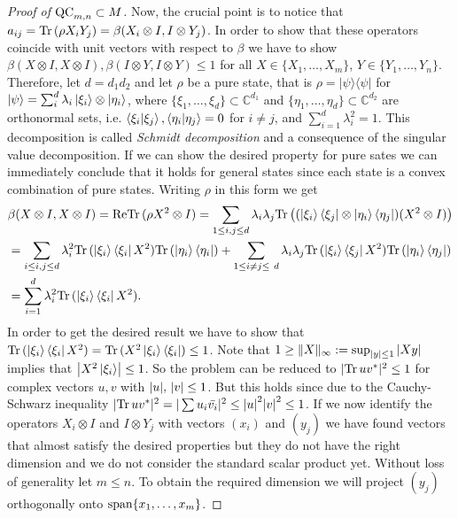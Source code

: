 \begin{proof}[Proof of $ \textup{QC}_{m,n} \subset M $]
	\noindent Now, the crucial point is to notice that $ a_{ij} =\textup{Tr} \, {(\rho X_i Y_j)} =  \beta(X_i \otimes I,I \otimes Y_j) $. In order to show that these operators coincide with unit vectors with respect to $  \beta  $ we have to show
	$ \beta(X \otimes I, X \otimes I), \beta(I \otimes Y, I \otimes Y) \le 1$ for all $ X \in \{X_1,\hdots,X_m \} $, $ Y \in \{Y_1,\hdots,Y_n \} $. 
	Therefore, let $ d = d_1d_2 $ and let $ \rho $ be a pure state, that is $ \rho = \vert \psi \rangle \langle \psi \vert $ for $ \vert \psi \rangle = \sum_{i}^{d}\lambda_i \ket{\xi_i} \otimes \ket{\eta_i} $, where $ \{ \xi_1,\hdots,\xi_d \} \subset \mathbb{C}^{d_1}$ and $ \{  \eta_1,\hdots,\eta_d\} \subset \mathbb{C}^{d_2}$ are orthonormal sets, i.e. $ \braket{\xi_i \vert \xi_j}, \braket{\eta_i \vert \eta_j} = 0 $ for $ i \neq j $, and $ \sum_{i=1}^d \lambda_i^2 = 1 $. This decomposition is called {\itshape Schmidt decomposition} and a consequence of the singular value decomposition. If we can show the desired property for pure sates we can immediately conclude that it holds for general states since each state is a convex combination of pure states. 
	Writing $ \rho $ in this form we get 
	\begin{align*}
	&\beta(X \otimes I, X \otimes I) = \textup{Re} \textup{Tr} \, {(\rho X^2 \otimes I)} =  \sum_{1 \le i,j \le d} \lambda_i\lambda_j \textup{Tr} \, {\big ((\ket{\xi_i} \bra{\xi_j} \otimes \ket{\eta_i}\bra{\eta_j})(X^2 \otimes I)\big ) }  \\
	&= \sum_{i\le i,j \le d}\lambda_i^2 \textup{Tr} \, {(\ket{\xi_i} \bra{\xi_i}X^2)} \textup{Tr} \, {(\ket{\eta_i}\bra{\eta_i})}   +  \sum_{1 \le i \neq j \le \ d}\lambda_i\lambda_j \textup{Tr} \, {(\ket{\xi_i}\bra{\xi_j}X^2)} \textup{Tr} \, {(\ket{\eta_i}\bra{\eta_j})}    \\
	&=  \sum_{i=1}^{d}\lambda_i^2 \textup{Tr} \, {(\ket{\xi_i} \bra{\xi_i}X^2)} .
	\end{align*}
	In order to get the desired result we have to show that $ \textup{Tr} \, {(\ket{\xi_i} \bra{\xi_i}X^2)}  = \textup{Tr} \, {(X^2\ket{\xi_i} \bra{\xi_i})}  \le 1 $. 
	Note that $1 \ge  \Vert {X} \Vert_{\infty} := \sup_{{\left|{y}\right|}\le 1} {\left|{Xy}\right|} $ implies that $ {\left|{X^2\ket{\xi_i}}\right|} \le 1 $. So the problem can be reduced to $ \vert \textup{Tr} \, {uv^*} \vert^2 \le 1 $ for complex vectors $ u,v $ with $ {\left|{u}\right|},\, {\left|{v}\right|} \le 1 $. But this holds since due to the Cauchy-Schwarz inequality 
	$ \vert\textup{Tr} \, {uv^*} \vert^2 = \vert\sum u_i \bar{v_i}\vert^2 \le {\left|{u}\right|}^2{\left|{v}\right|}^2 \le 1 $.
	\noindent If we now identify the operators $ X_i \otimes I $ and $  I \otimes Y_j$ with vectors
	$ (x_i) $ and $ (y_j) $ we have found vectors that almost satisfy the desired properties but they do not have the right dimension and we do not consider the standard scalar product yet. Without loss of generality let $ m \le n $. To obtain the required dimension we will project $ (y_j) $ orthogonally onto $ \textup{span}\{ x_1,\hdots,x_m \} $.

\end{proof}

